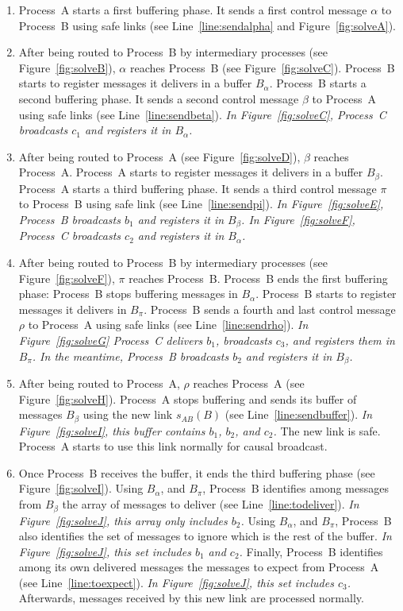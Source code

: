\begin{enumerate}[leftmargin=*]
\item Process~A starts a first buffering phase. It sends a first control message
  $\alpha$ to Process~B using safe links (see Line~\ref{line:sendalpha} and
  Figure~\ref{fig:solveA}).
\item After being routed to Process~B by intermediary processes (see
  Figure~\ref{fig:solveB}), $\alpha$ reaches Process~B (see
  Figure~\ref{fig:solveC}).  Process~B starts to register messages it delivers
  in a buffer $B_\alpha$.  Process~B starts a second buffering phase. It sends a
  second control message $\beta$ to Process~A using safe links (see
  Line~\ref{line:sendbeta}). \emph{In Figure~\ref{fig:solveC}, Process~C
    broadcasts $c_1$ and registers it in $B_\alpha$.}
\item After being routed to Process~A (see Figure~\ref{fig:solveD}), $\beta$
  reaches Process~A. Process~A starts to register messages it delivers in a
  buffer $B_\beta$. Process~A starts a third buffering phase. It sends a third
  control message $\pi$ to Process~B using safe link (see
  Line~\ref{line:sendpi}). \emph{In Figure~\ref{fig:solveE}, Process~B
    broadcasts $b_1$ and registers it in $B_\beta$. In Figure~\ref{fig:solveF},
    Process~C broadcasts $c_2$ and registers it in $B_\alpha$.}
\item After being routed to Process~B by intermediary processes (see
  Figure~\ref{fig:solveF}), $\pi$ reaches Process~B. Process~B ends the first
  buffering phase: Process~B stops buffering messages in $B_\alpha$.  Process~B
  starts to register messages it delivers in $B_\pi$.  Process~B sends a fourth
  and last control message $\rho$ to Process~A using safe links (see
  Line~\ref{line:sendrho}). \emph{In Figure~\ref{fig:solveG} Process~C delivers
    $b_1$, broadcasts $c_3$, and registers them in $B_\pi$. In the meantime,
    Process~B broadcasts $b_2$ and registers it in $B_\beta$.}
\item After being routed to Process~A, $\rho$ reaches Process~A (see
  Figure~\ref{fig:solveH}).  Process~A stops buffering and sends its buffer of
  messages $B_\beta$ using the new link $s_{AB}(B)$ (see
  Line~\ref{line:sendbuffer}). \emph{In Figure~\ref{fig:solveI}, this buffer
    contains $b_1$, $b_2$, and $c_2$.} The new link is safe. Process~A starts to
  use this link normally for causal broadcast.
\item Once Process~B receives the buffer, it ends the third buffering phase (see
  Figure~\ref{fig:solveI}). Using $B_\alpha$, and $B_\pi$, Process~B identifies
  among messages from $B_\beta$ the array of messages to deliver (see
  Line~\ref{line:todeliver}). \emph{In Figure~\ref{fig:solveJ}, this array only
    includes $b_2$.}  Using $B_\alpha$, and $B_\pi$, Process~B also identifies
  the set of messages to ignore which is the rest of the buffer. \emph{In
    Figure~\ref{fig:solveJ}, this set includes $b_1$ and $c_2$.} Finally,
  Process~B identifies among its own delivered messages the messages to expect
  from Process~A (see Line~\ref{line:toexpect}). \emph{In
    Figure~\ref{fig:solveJ}, this set includes $c_3$.} Afterwards, messages
  received by this new link are processed normally.
\end{enumerate}
